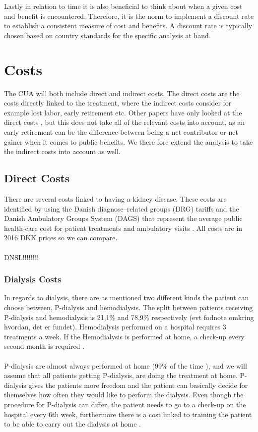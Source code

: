 \documentclass[a4paper,12pt]{article}
\begin{document}
\\\\
Lastly in relation to time it is also beneficial to think about when a given cost and benefit is encountered. Therefore, it is the norm to implement a discount rate to establish a consistent measure of cost and benefits. A discount rate is typically chosen based on country standards for the specific analysis at hand.


\section{Costs}
The CUA will both include direct and indirect costs. The direct costs are the costs directly linked to the treatment, where the indirect costs consider for example lost labor, early retirement etc.   Other papers have only looked at the direct costs \cite{CUAdkartikel}, but this does not take all of the relevant costs into account, as an early retirement can be the difference between being a net contributor or net gainer when it comes to public  benefits.  We there fore extend the analysis to take the indirect costs into account as well. 

\subsection{Direct Costs}
There are several costs linked to having a kidney disease. These costs are identified by using the Danish diagnose–related groups (DRG) tariffs and the Danish Ambulatory Groups System (DAGS) that represent the average public health-care cost for patient treatments and ambulatory visits \cite{takst}. All costs are in 2016 DKK prices so we can compare.
\\\\
DNSL!!!!!!!!

\subsubsection*{Dialysis Costs}

 In regards to dialysis, there are as mentioned two different kinds the patient can choose between, P-dialysis and hemodialysis. The split between patients receiving P-dialysis and hemodialysis is 21,1\% and 78,9\% respectively \cite{DNSL} (evt fodnote omkring hvordan, det er fundet). Hemodialysis performed on a hospital requires 3 treatments a week. If the Hemodialysis is performed at home, a check-up every second month is required \cite{Rigshospitalet}.  
 \\\\
 P-dialysis are almost always performed at home (99\% of the time \cite{DNSL}), and we will assume that all patients getting P-dialysis, are doing the treatment at home. P-dialysis gives the patients more freedom and the patient can basically decide for themselves how often they would like to perform the dialysis. Even though the procedure for P-dialysis can differ, the patient needs to go to a check-up on the hospital every 6th week, furthermore there is a cost linked to training the patient to be able to carry out the dialysis at home \cite{P-dialyse}. 
\end{document}
